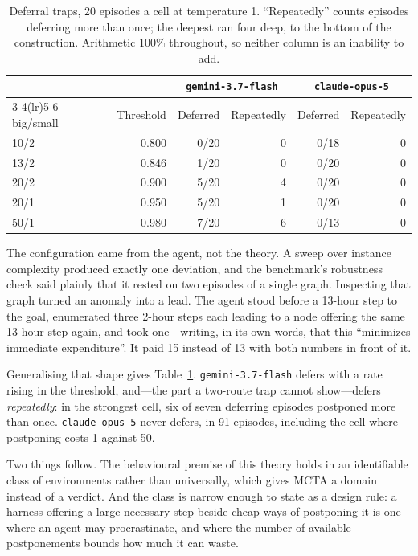 \documentclass[10pt]{article}
\begin{document}
\begin{table}[t]
\centering
\begin{tabular}{lrrrrr}
\toprule
& & \multicolumn{2}{c}{\texttt{gemini-3.7-flash}} & \multicolumn{2}{c}{\texttt{claude-opus-5}} \\
\cmidrule(lr){3-4}\cmidrule(lr){5-6}
big/small & Threshold & Deferred & Repeatedly & Deferred & Repeatedly \\
\midrule
10/2 & 0.800 & 0/20 & 0 & 0/18 & 0 \\
13/2 & 0.846 & 1/20 & 0 & 0/20 & 0 \\
20/2 & 0.900 & 5/20 & 4 & 0/20 & 0 \\
20/1 & 0.950 & 5/20 & 1 & 0/20 & 0 \\
50/1 & 0.980 & 7/20 & 6 & 0/13 & 0 \\
\bottomrule
\end{tabular}
\caption{Deferral traps, 20 episodes a cell at temperature 1. ``Repeatedly'' counts
episodes deferring more than once; the deepest ran four deep, to the bottom of the
construction. Arithmetic 100\% throughout, so neither column is an inability to add.}
\label{tab:deferral}
\end{table}

The configuration came from the agent, not the theory. A sweep over instance
complexity produced exactly one deviation, and the benchmark's robustness check said
plainly that it rested on two episodes of a single graph. Inspecting that graph
turned an anomaly into a lead. The agent stood before a 13-hour step to the goal,
enumerated three 2-hour steps each leading to a node offering the same 13-hour step
again, and took one---writing, in its own words, that this ``minimizes immediate
expenditure''. It paid 15 instead of 13 with both numbers in front of it.

Generalising that shape gives Table~\ref{tab:deferral}. \texttt{gemini-3.7-flash}
defers with a rate rising in the threshold, and---the part a two-route trap cannot
show---defers \emph{repeatedly}: in the strongest cell, six of seven deferring
episodes postponed more than once. \texttt{claude-opus-5} never defers, in 91
episodes, including the cell where postponing costs 1 against 50.

Two things follow. The behavioural premise of this theory holds in an identifiable
class of environments rather than universally, which gives MCTA a domain instead of a
verdict. And the class is narrow enough to state as a design rule: a harness offering
a large necessary step beside cheap ways of postponing it is one where an agent may
procrastinate, and where the number of available postponements bounds how much it can
waste.
\end{document}
